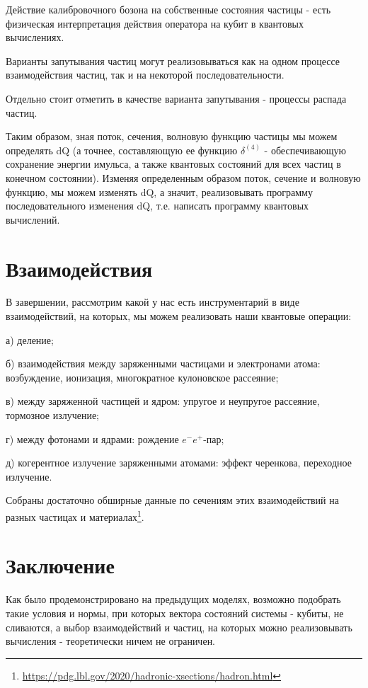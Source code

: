 \documentclass[11pt]{article}
\begin{document}
Действие калибровочного бозона на собственные состояния частицы - есть физическая интерпретация действия оператора на кубит в квантовых вычислениях.

Варианты запутывания частиц могут реализовываться как на одном процессе взаимодействия частиц, так и на некоторой последовательности. 

Отдельно стоит отметить в качестве варианта запутывания - процессы распада частиц. 

Таким образом, зная поток, сечения, волновую функцию частицы мы можем определять dQ (а точнее, составляющую ее функцию  $\delta ^{(4)} $ - обеспечивающую сохранение энергии имульса, а также квантовых состояний для всех частиц в конечном состоянии). Изменяя определенным образом поток, сечение и волновую функцию, мы можем изменять dQ, а значит, реализовывать программу последовательного изменения dQ, т.е. написать программу квантовых вычислений.

\section{Взаимодействия}
В завершении, рассмотрим какой у нас есть инструментарий в виде взаимодействий, на которых, мы можем реализовать наши квантовые операции: 

а) деление; 

б) взаимодействия между заряженными частицами и электронами атома: возбуждение, ионизация, многократное кулоновское рассеяние;

в) между заряженной частицей и ядром: упругое и неупругое рассеяние, тормозное излучение;

г) между фотонами и ядрами: рождение $e^{-}e^{+}$-пар;

д) когерентное излучение заряженными атомами: эффект черенкова, переходное излучение. 

Собраны достаточно обширные данные по сечениям этих взаимодействий на разных частицах и материалах\footnote{\url{https://pdg.lbl.gov/2020/hadronic-xsections/hadron.html}}.

\section{Заключение}

Как было продемонстрировано на предыдущих моделях, возможно подобрать такие условия и нормы, при которых вектора состояний системы - кубиты, не сливаются, а выбор взаимодействий и частиц, на которых можно реализовывать вычисления - теоретически ничем не ограничен. 
\end{document}
